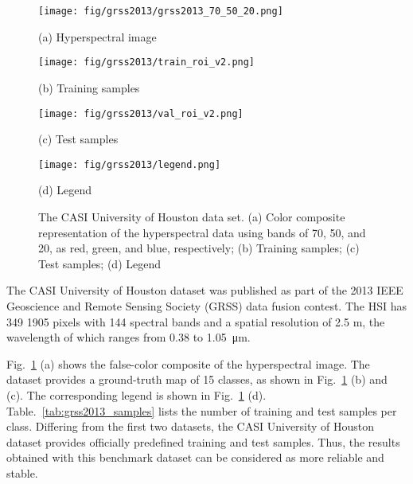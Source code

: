 \documentclass[journal]{IEEEtran}
\begin{document}
\begin{figure}[htb]
  \begin{minipage}[b]{\linewidth}
    \centering
    \texttt{[image: fig/grss2013/grss2013\_70\_50\_20.png]}
    \centerline{(a) Hyperspectral image}
  \end{minipage}
  \vfill
  \vspace{4pt}
  \begin{minipage}[b]{\linewidth}
    \centering
    \texttt{[image: fig/grss2013/train\_roi\_v2.png]}
    \centerline{(b) Training samples}
  \end{minipage}
  \vfill
  \vspace{4pt}
  \begin{minipage}[b]{\linewidth}
    \centering
    \texttt{[image: fig/grss2013/val\_roi\_v2.png]}
    \centerline{(c) Test samples}
  \end{minipage}
  \vfill
  \vspace{4pt}
  \begin{minipage}[b]{\linewidth}
    \centering
    \texttt{[image: fig/grss2013/legend.png]}
    \centerline{(d) Legend}
  \end{minipage}
  \caption{The CASI University of Houston data set. (a) Color composite representation of the hyperspectral data using bands of 70, 50, and 20, as red, green, and blue, respectively; (b) Training samples; (c) Test samples; (d) Legend}
  \label{fig:grss2013}
\end{figure}

The CASI University of Houston dataset was published as part of the 2013 IEEE Geoscience and Remote Sensing Society (GRSS) data fusion contest.
The HSI has 349  1905 pixels with 144 spectral bands and a spatial resolution of 2.5 m, the wavelength of which ranges from 0.38 to \SI{1.05}{\micro\metre}.

Fig.~\ref{fig:grss2013} (a) shows the false-color composite of the hyperspectral image.
The dataset provides a ground-truth map of 15 classes, as shown in Fig.~\ref{fig:grss2013} (b) and (c).
The corresponding legend is shown in Fig.~\ref{fig:grss2013} (d).
Table.~\ref{tab:grss2013_samples} lists the number of training and test samples per class.
Differing from the first two datasets, the CASI University of Houston dataset provides officially predefined training and test samples.
Thus, the results obtained with this benchmark dataset can be considered as more reliable and stable.
\end{document}
